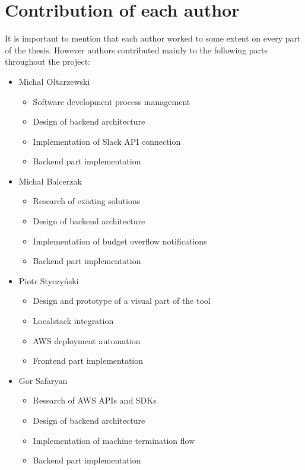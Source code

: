 \documentclass[licencjacka,en]{thesisclass}
\begin{document}
    \section{Contribution of each author}

    It is important to mention that each author worked to some extent on every part of the thesis.
    However authors contributed mainly to the following parts throughout the project:

    \begin{itemize}
        \item Michał Ołtarzewski
        \begin{itemize}
            \item Software development process management
            \item Design of backend architecture
            \item Implementation of Slack API connection
            \item Backend part implementation
        \end{itemize}
        \item Michał Balcerzak
        \begin{itemize}
            \item Research of existing solutions
            \item Design of backend architecture
            \item Implementation of budget overflow notifications
            \item Backend part implementation
        \end{itemize}
        \item Piotr Styczyński
        \begin{itemize}
            \item Design and prototype of a visual part of the tool
            \item Localstack integration
            \item AWS deployment automation
            \item Frontend part implementation
        \end{itemize}
        \item Gor Safaryan
        \begin{itemize}
            \item Research of AWS APIs and SDKs
            \item Design of backend architecture
            \item Implementation of machine termination flow
            \item Backend part implementation
        \end{itemize}
    \end{itemize}
\end{document}
